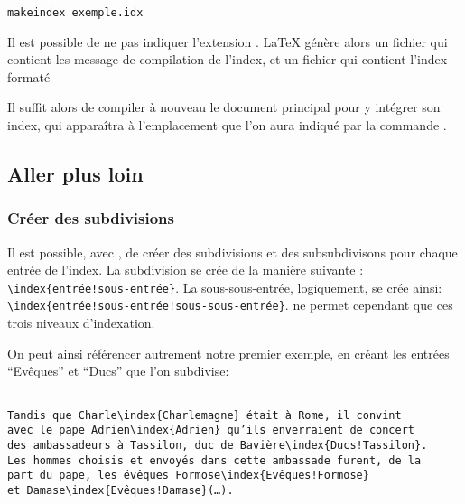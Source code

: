 \begin{verbatim}
makeindex exemple.idx
\end{verbatim}

Il est possible de ne pas indiquer l'extension .
\LaTeX{} génère alors un fichier  qui contient les message de compilation de l'index, et un fichier  qui contient l'index formaté%


%

%

Il suffit alors de compiler à nouveau le document principal pour y intégrer son index, qui apparaîtra à l'emplacement que l'on aura indiqué par la commande .



\subsection{Aller plus loin}
\subsubsection{Créer des subdivisions}

Il est possible, avec ,  de créer des subdivisions et des subsubdivisons  pour chaque entrée de l'index. La subdivision se crée de la manière suivante : \verb+\index{entrée!sous-entrée}+. La sous-sous-entrée, logiquement, se crée ainsi: \verb+\index{entrée!sous-entrée!sous-sous-entrée}+.  ne permet cependant que ces trois niveaux d'indexation.

On peut ainsi référencer autrement notre premier exemple, en créant les entrées \enquote{Evêques} et \enquote{Ducs} que l'on subdivise:

\begin{verbatim}

Tandis que Charle\index{Charlemagne} était à Rome, il convint 
avec le pape Adrien\index{Adrien} qu’ils enverraient de concert 
des ambassadeurs à Tassilon, duc de Bavière\index{Ducs!Tassilon}.
Les hommes choisis et envoyés dans cette ambassade furent, de la 
part du pape, les évêques Formose\index{Evêques!Formose}
et Damase\index{Evêques!Damase}(…).

\end{verbatim}

